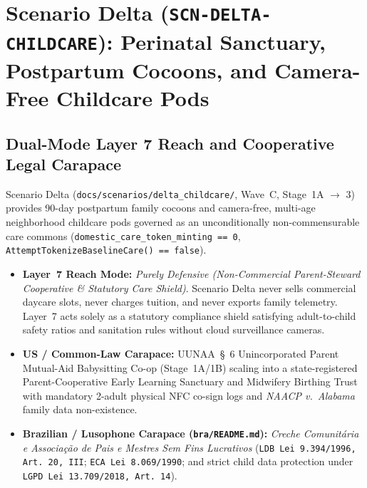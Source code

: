\chapter{Scenario Delta (\texttt{SCN-DELTA-CHILDCARE}): Perinatal Sanctuary, Postpartum Cocoons, and Camera-Free Childcare Pods}
\label{app:scenario-delta}

\section{Dual-Mode Layer 7 Reach and Cooperative Legal Carapace}
Scenario Delta (\texttt{docs/scenarios/delta\_childcare/}, Wave~C, Stage~1A $\to$ 3) provides 90-day postpartum family cocoons and camera-free, multi-age neighborhood childcare pods governed as an unconditionally non-commensurable care commons (\texttt{domestic\_care\_token\_minting == 0}, \texttt{AttemptTokenizeBaselineCare() == false}).
\begin{itemize}
    \item \textbf{Layer~7 Reach Mode:} \textit{Purely Defensive (Non-Commercial Parent-Steward Cooperative \& Statutory Care Shield)}. Scenario Delta never sells commercial daycare slots, never charges tuition, and never exports family telemetry. Layer~7 acts solely as a statutory compliance shield satisfying adult-to-child safety ratios and sanitation rules without cloud surveillance cameras.
    \item \textbf{US / Common-Law Carapace:} UUNAA~\S~6 Unincorporated Parent Mutual-Aid Babysitting Co-op (Stage~1A/1B) scaling into a state-registered Parent-Cooperative Early Learning Sanctuary and Midwifery Birthing Trust with mandatory 2-adult physical NFC co-sign logs and \textit{NAACP v.~Alabama} family data non-existence.
    \item \textbf{Brazilian / Lusophone Carapace (\texttt{bra/README.md}):} \textit{Creche Comunit{\'a}ria e Associa{\c{c}}{\~a}o de Pais e Mestres Sem Fins Lucrativos} (\texttt{LDB Lei 9.394/1996, Art.~20, III}; \texttt{ECA Lei 8.069/1990}; and strict child data protection under \texttt{LGPD Lei 13.709/2018, Art.~14}).
\end{itemize}


